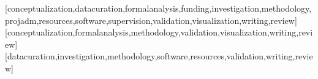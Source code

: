\documentclass[english]{textolivre}
\begin{document}
\begin{english}
\printbibliography[title={References}]\label{sec-bib}
\end{english}



\begin{contributors}
[conceptualization,datacuration,formalanalysis,funding,investigation,methodology,projadm,resources,software,supervision,validation,visualization,writing,review]
[conceptualization,formalanalysis,methodology,validation,visualization,writing,review]
[datacuration,investigation,methodology,software,resources,validation,writing,review]
\end{contributors}

\begin{dataavailability}
\end{dataavailability}
\end{document}
